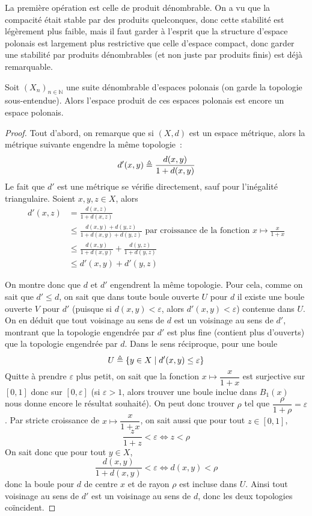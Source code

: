 La première opération est celle de produit dénombrable. On a vu que la compacité
était stable par des produits quelconques, donc cette stabilité est légèrement
plus faible, mais il faut garder à l'esprit que la structure d'espace polonais
est largement plus restrictive que celle d'espace compact, donc garder une
stabilité par produits dénombrables (et non juste par produits finis) est déjà
remarquable.

\begin{proposition}
  Soit $(X_n)_{n\in \mathbb N}$ une suite dénombrable d'espaces polonais (on garde
  la topologie sous-entendue). Alors l'espace produit de ces espaces polonais
  est encore un espace polonais.
\end{proposition}

\begin{proof}
  Tout d'abord, on remarque que si $(X,d)$ est un espace métrique, alors la
  métrique suivante engendre la même topologie~:
  \[d'(x,y) \triangleq \frac{d(x,y)}{1+d(x,y)}\]
  Le fait que $d'$ est une métrique se vérifie directement, sauf pour
  l'inégalité triangulaire. Soient $x,y,z \in X$, alors
  \begin{align*}
    d'(x,z) &= \frac{d(x,z)}{1 + d(x,z)}\\
    &\leq \frac{d(x,y) + d(y,z)}{1 + d(x,y) + d(y,z)}\text{ par croissance
      de la fonction } x \mapsto \frac{x}{1 + x}\\
    &\leq \frac{d(x,y)}{1 + d(x,y)} + \frac{d(y,z)}{1 + d(y,z)}\\
    &\leq d'(x,y) + d'(y,z)
  \end{align*}

  On montre donc que $d$ et $d'$ engendrent la même topologie. Pour cela,
  comme on sait que $d' \leq d$, on sait que dans toute boule ouverte $U$ pour
  $d$ il existe une boule ouverte $V$ pour $d'$ (puisque si
  $d(x,y) < \varepsilon$, alors $d'(x,y) < \varepsilon$) contenue dans $U$. On
  en déduit que tout voisinage au sens de $d$ est un voisinage au sens de $d'$,
  montrant que la topologie engendrée par $d'$ est plus fine (contient plus
  d'ouverts) que la topologie engendrée par $d$. Dans le sens réciproque, pour
  une boule
  \[U \triangleq \{ y \in X \mid d'(x,y) \leq \varepsilon\}\]
  Quitte à prendre $\varepsilon$ plus petit, on sait que la fonction
  $x\mapsto \dfrac{x}{1 + x}$ est surjective sur $[0,1]$ donc sur
  $[0,\varepsilon]$ (si $\varepsilon > 1$, alors trouver une boule inclue dans
  $B_1(x)$ nous donne encore le résultat souhaité). On peut donc trouver
  $\rho$ tel que $\dfrac{\rho}{1 + \rho} = \varepsilon$. Par stricte croissance
  de $x\mapsto \dfrac{x}{1 + x}$, on sait aussi que pour tout $z \in [0,1]$,
  \[\frac{z}{1 + z} < \varepsilon \iff z < \rho\]
  On sait donc que pour tout $y \in X$,
  \[\frac{d(x,y)}{1 + d(x,y)}< \varepsilon \iff d(x,y) < \rho\]
  donc la boule pour $d$ de centre $x$ et de rayon $\rho$ est incluse dans $U$.
  Ainsi tout voisinage au sens de $d'$ est un voisinage au sens de $d$, donc
  les deux topologies coïncident.
  

\end{proof}
